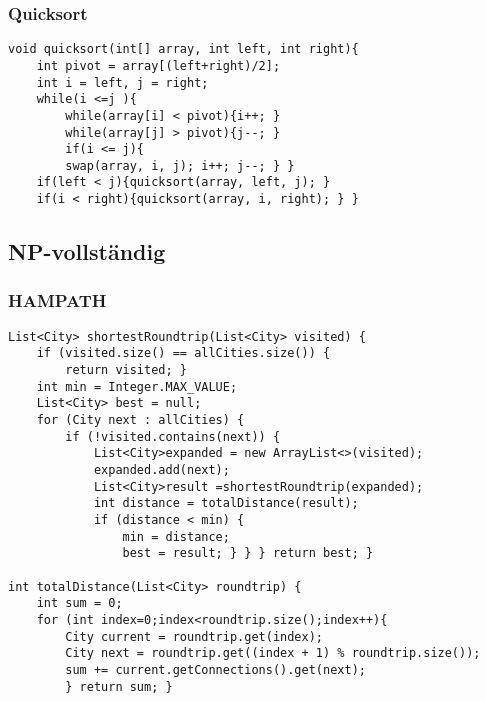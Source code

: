 \begin{multicols*}{5}
	\subsubsection{Quicksort}
		\begin{lstlisting}
void quicksort(int[] array, int left, int right){
	int pivot = array[(left+right)/2];
	int i = left, j = right;
	while(i <=j ){
		while(array[i] < pivot){i++; }
		while(array[j] > pivot){j--; }
		if(i <= j){
		swap(array, i, j); i++; j--; } }
	if(left < j){quicksort(array, left, j); }
	if(i < right){quicksort(array, i, right); } }
		\end{lstlisting}



	\subsection{NP-vollständig}
	\subsubsection{HAMPATH}
		\begin{lstlisting}
List<City> shortestRoundtrip(List<City> visited) { 
	if (visited.size() == allCities.size()) {
		return visited; }
	int min = Integer.MAX_VALUE; 
	List<City> best = null;
	for (City next : allCities) {
		if (!visited.contains(next)) {
			List<City>expanded = new ArrayList<>(visited); 
			expanded.add(next);
			List<City>result =shortestRoundtrip(expanded); 
			int distance = totalDistance(result);
			if (distance < min) {
				min = distance; 
				best = result; } } } return best; }

int totalDistance(List<City> roundtrip) { 
	int sum = 0;
	for (int index=0;index<roundtrip.size();index++){
		City current = roundtrip.get(index);
		City next = roundtrip.get((index + 1) % roundtrip.size()); 
		sum += current.getConnections().get(next);
		} return sum; }

		\end{lstlisting}









	


\end{multicols*}

% 

